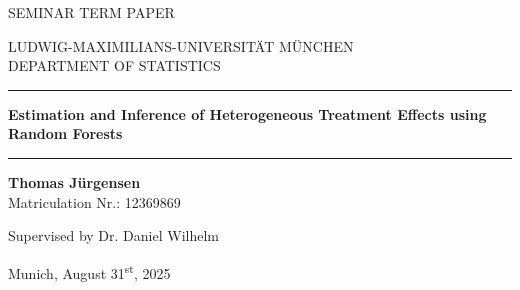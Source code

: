 \begin{titlepage}
\begin{center}

\Large
SEMINAR TERM PAPER

\vspace{0.5cm}
\Large
LUDWIG-MAXIMILIANS-UNIVERSITÄT MÜNCHEN\\
DEPARTMENT OF STATISTICS

\vspace{0.5cm}

\rule{\textwidth}{1.5pt}
\LARGE
\textbf{Estimation and Inference of Heterogeneous Treatment Effects using Random Forests}
\rule{\textwidth}{1.5pt}

\vspace{0.5cm}

\Large
\textbf{Thomas Jürgensen}\\
\large
Matriculation Nr.: 12369869

\vspace{0.5cm}

Supervised by Dr. Daniel Wilhelm

\vspace{0.5cm}

\large
Munich, August 31\textsuperscript{st}, 2025
      
\vspace{0.5cm}



\vfill

\end{center}
\end{titlepage}
\newpage
\newpage
